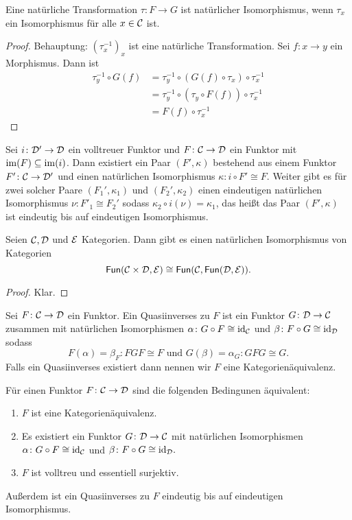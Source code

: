 \begin{Lemma}
    Eine natürliche Transformation $\tau\colon F\to G$ ist natürlicher Isomorphismus, wenn $\tau_x$ ein Isomorphismus für alle $x\in \mathcal{C}$ ist.
\end{Lemma}
\begin{proof}
    Behauptung: $(\tau^{-1}_x)_x$ ist eine natürliche Transformation. Sei $f\colon x\to y$ ein Morphismus. Dann ist 
    \begin{align*}
        \tau_y^{-1}\circ G(f)&=\tau_y^{-1}\circ (G(f)\circ \tau_x)\circ \tau_x^{-1}\\
        &= \tau_y^{-1}\circ( \tau_y \circ F(f))\circ\tau_x^{-1}\\
        &= F(f)\circ \tau_x^{-1}
    \end{align*}
\end{proof}
\begin{Satz}\label{Satz:BildFunktor}
    Sei $i\colon\mathcal{D}'\to\mathcal{D}$ ein volltreuer Funktor und $F\colon\mathcal{C}\to\mathcal{D}$ ein Funktor mit $\operatorname{im}(F)\subseteq \operatorname{im}(i)$. Dann existiert ein Paar $(F',\kappa)$ bestehend aus einem Funktor $F'\colon\mathcal{C}\to \mathcal{D}'$ und einen natürlichen Isomorphismus $\kappa\colon i\circ F'\cong F$. Weiter gibt es für zwei solcher Paare $(F_1',\kappa_1)$ und $(F_2',\kappa_2)$ einen eindeutigen natürlichen Isomorphismus $\nu\colon F'_1\cong F_2'$ sodass $\kappa_2\circ i(\nu)=\kappa_1$, das heißt das Paar $(F',\kappa)$ ist eindeutig bis auf eindeutigen Isomorphismus.
\end{Satz}
\begin{Lemma}
    Seien $\mathcal{C},\mathcal{D}$ und $\mathcal{E}$ Kategorien. Dann gibt es einen natürlichen Isomorphismus von Kategorien 
    $$\mathsf{Fun}(\mathcal{C}\times\mathcal{D},\mathcal{E})\cong \mathsf{Fun}(\mathcal{C},\mathsf{Fun}(\mathcal{D},\mathcal{E})).$$
\end{Lemma}
\begin{proof}
    Klar.
\end{proof}
\begin{Def}[Kategorienäquivalenz]
Sei $F\colon\mathcal{C}\to\mathcal{D}$ ein Funktor. Ein Quasiinverses zu $F$ ist ein Funktor $G\colon\mathcal{D}\to\mathcal{C}$ zusammen mit natürlichen Isomorphismen $\alpha\colon G\circ F\cong \mathrm{id}_{\mathcal{C}}$ und $\beta\colon F\circ G\cong \mathrm{id}_{\mathcal{D}}$ sodass 
$$F(\alpha)=\beta_F\colon FGF\cong F \text{ und } G(\beta)=\alpha_G\colon GFG\cong G.$$
Falls ein Quasiinverses existiert dann nennen wir $F$ eine Kategorienäquivalenz.
    
\end{Def}
\begin{Satz}
    Für einen Funktor $F\colon\mathcal{C}\to\mathcal{D}$ sind die folgenden Bedingunen äquivalent:
    \begin{enumerate}
        \item $F$ ist eine Kategorienäquivalenz.
        \item Es existiert ein Funktor $G\colon\mathcal{D}\to\mathcal{C}$ mit natürlichen Isomorphismen $\alpha\colon G\circ F\cong \mathrm{id}_{\mathcal{C}}$ und $\beta\colon F\circ G\cong \mathrm{id}_{\mathcal{D}}.$
        \item $F$ ist volltreu und essentiell surjektiv.
    \end{enumerate}
    Außerdem ist ein Quasiinverses zu $F$ eindeutig bis auf eindeutigen Isomorphismus.
\end{Satz}
